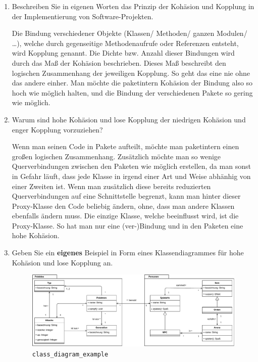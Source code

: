 \documentclass{article}
\newcommand{\gqq}[1]{\glqq{}#1\grqq{}}
\begin{document}
    \begin{enumerate}
        \item Beschreiben Sie in eigenen Worten das Prinzip der Kohäsion und Kopplung in der Implementierung von Software-Projekten.

            Die Bindung verschiedener Objekte (Klassen/ Methoden/ ganzen Modulen/ \ldots), welche durch gegenseitige Methodenaufrufe oder Referenzen entsteht, wird Kopplung genannt.
            Die Dichte bzw. Anzahl dieser Bindungen wird durch das Maß der Kohäsion beschrieben.
            Dieses Maß beschreibt den logischen Zusammenhang der jeweiligen Kopplung.
            So geht das eine nie ohne das andere einher.
            Man möchte die paketintern Kohäsion der Bindung also so hoch wie möglich halten, und die Bindung der verschiedenen Pakete so gering wie möglich.
        
        \item Warum sind hohe Kohäsion und lose Kopplung der niedrigen Kohäsion und enger Kopplung vorzuziehen?
        
            Wenn man seinen Code in Pakete aufteilt, möchte man paketintern einen großen logischen Zusammenhang.
            Zusätzlich möchte man so wenige Querverbindungen zwischen den Paketen wie möglich erstellen, da man sonst in Gefahr läuft, dass jede Klasse in irgend einer Art und Weise abhänhig von einer Zweiten ist.
            Wenn man zusätzlich diese bereits reduzierten Querverbindungen auf eine Schnittstelle begrenzt, kann man \gqq{hinter} dieser \gqq{Proxy}-Klasse den Code beliebig ändern, ohne, dass man andere Klassen ebenfalls ändern muss.
            Die einzige Klasse, welche beeinflusst wird, ist die \gqq{Proxy}-Klasse. So hat man nur eine (ver-)Bindung und in den Paketen eine hohe Kohäsion.

        \item Geben Sie ein \textbf{eigenes} Beispiel in Form eines Klassendiagrammes für hohe Kohäsion und lose Kopplung an.
        
            \begin{figure}[ht]
                \includegraphics[width=\textwidth]{swt_wende_tim_h07_class_diagram_example.pdf}
                \caption{\texttt{class\_diagram\_example}}
            \end{figure}
    \end{enumerate}
\end{document}
